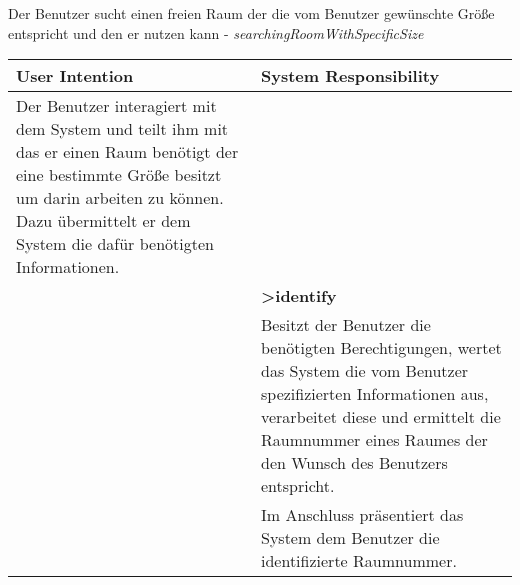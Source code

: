 \begin{table}[h]
	Der Benutzer sucht einen freien Raum der die vom Benutzer gewünschte Größe entspricht und den er nutzen kann - \textit{searchingRoomWithSpecificSize}\\
	\begin{tabularx}{\textwidth}{|X|X|}
	\rowcolor{heading} \textbf{User Intention} & \textbf{System Responsibility}\\ \hline
	Der Benutzer interagiert mit dem System und teilt ihm mit das er einen Raum benötigt der eine bestimmte Größe besitzt um darin arbeiten zu können. Dazu übermittelt er dem System die dafür benötigten Informationen. & \\  \hline
	 & \textbf{>identify} \\ \hline
	 & Besitzt der Benutzer die benötigten Berechtigungen, wertet das System die vom Benutzer spezifizierten Informationen aus, verarbeitet diese und ermittelt die Raumnummer eines Raumes der den Wunsch des Benutzers entspricht.\\ \hline
	 & Im Anschluss präsentiert das System dem Benutzer die identifizierte Raumnummer.\\ \hline
	\end{tabularx}
\end{table}